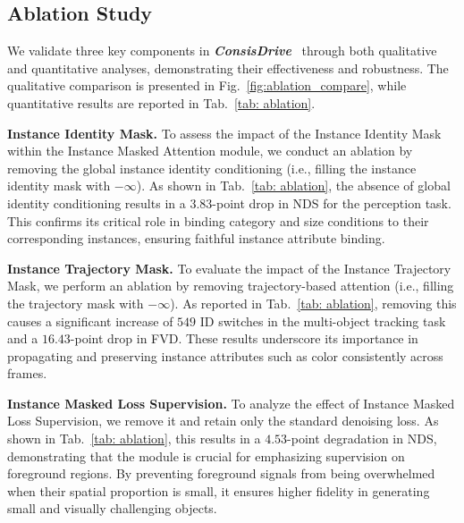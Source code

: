 \documentclass{article} %
\def\titleDef{\textbf{\textit{ConsisDrive}}}
\begin{document}
\subsection{Ablation Study}
\label{sec: ablation}
We validate three key components in \titleDef~ through both qualitative and quantitative analyses, demonstrating their effectiveness and robustness.  
The qualitative comparison is presented in Fig.~\ref{fig:ablation_compare}, while quantitative results are reported in Tab.~\ref{tab: ablation}.  

\noindent \textbf{Instance Identity Mask.}  
To assess the impact of the Instance Identity Mask within the Instance Masked Attention module, we conduct an ablation by removing the global instance identity conditioning (i.e., filling the instance identity mask with $-\infty$).  
As shown in Tab.~\ref{tab: ablation}, the absence of global identity conditioning results in a $3.83$-point drop in NDS for the perception task.  
This confirms its critical role in binding category and size conditions to their corresponding instances, ensuring faithful instance attribute binding.  

\noindent \textbf{Instance Trajectory Mask.}  
To evaluate the impact of the Instance Trajectory Mask, we perform an ablation by removing trajectory-based attention (i.e., filling the trajectory mask with $-\infty$).  
As reported in Tab.~\ref{tab: ablation}, removing this causes a significant increase of $549$ ID switches in the multi-object tracking task and a $16.43$-point drop in FVD.  
These results underscore its importance in propagating and preserving instance attributes such as color consistently across frames.  

\noindent \textbf{Instance Masked Loss Supervision.}  
To analyze the effect of Instance Masked Loss Supervision, we remove it and retain only the standard denoising loss.  
As shown in Tab.~\ref{tab: ablation}, this results in a $4.53$-point degradation in NDS, demonstrating that the module is crucial for emphasizing supervision on foreground regions.  
By preventing foreground signals from being overwhelmed when their spatial proportion is small, it ensures higher fidelity in generating small and visually challenging objects.  





\end{document}
